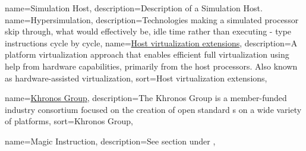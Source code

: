{
  name={Simulation Host},
  description={Description of a Simulation Host.}
}
\newcommand{\dvttermhost}{\dvtcmdcaponcegloss{dvtglosshost}{Host}}
\newcommand{\dvttermhewlettpackard}{Hewlett-Packard Company}
\newcommand{\dvttermhoneywell}{Honeywell International, Inc.}
{
  name={Hypersimulation},
  description={Technologies making a simulated processor skip through, what would effectively be, idle time rather than executing - type instructions cycle by cycle},
}
\newcommand{\dvttermhypersimulation}{\dvtcmdcaponcegloss{dvtglosshypersimulation}{Hypersimulation}}
{
  name={\href{http://en.wikipedia.org/wiki/Hardware-assisted_virtualization}{Host virtualization extensions}},
  description={A platform virtualization approach that enables efficient full virtualization using help from hardware capabilities, primarily from the host processors. Also known as hardware-assisted virtualization},
  sort={Host virtualization extensions},
}
\newcommand{\dvttermhostvirtualizationextensions}{\dvtcmdcaponcegloss{dvtglosshostvirtualizationextensions}{Host Virtualization Extensions}}

\newcommand{\dvtterminterpretation}{\dvtcmdcaponce{Interpretation}}
\newcommand{\dvttermintel}{Intel~Corporation}
\newcommand{\dvttermibm}{IBM}

\newcommand{\dvttermjit}{\dvtcmdabbrev{dvtglossjit}}
\newcommand{\dvttermjni}{\dvtcmdabbrev{dvtglossjni}}

{
  name={\href{http://en.wikipedia.org/wiki/Khronos_Group}{Khronos Group}},
  description={The Khronos Group is a member-funded industry consortium focused on the creation of open standard \dvttermapi s on a wide variety of platforms},
  sort={Khronos Group},
}
\newcommand{\dvttermkhronos}{\glslink{dvtglosskhronos}{Khronos}}

\newcommand{\dvttermlinux}{Linux}
\newcommand{\dvttermlockheedmartin}{Lockheed Martin}

\newcommand{\dvttermmipsecond}{\dvtcmdabbrev{dvtglossmipssecond}}
\newcommand{\dvttermmicrosoft}{Microsoft}
{
  name={Magic Instruction},
  description={See section  under },
}
\newcommand{\dvttermmagicinstruction}{\dvtcmdcaponcegloss{dvtglossmagicinstruction}{Magic Instruction}}

